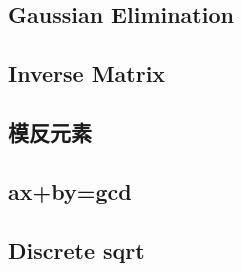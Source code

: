 \documentclass[a4paper,10pt,twocolumn,oneside]{article}
\begin{document}
%

%

\subsection{Gaussian Elimination}


\subsection{Inverse Matrix}


\subsection{模反元素}


\subsection{ax+by=gcd}


\subsection{Discrete sqrt}


% 

%

%
\end{document}
